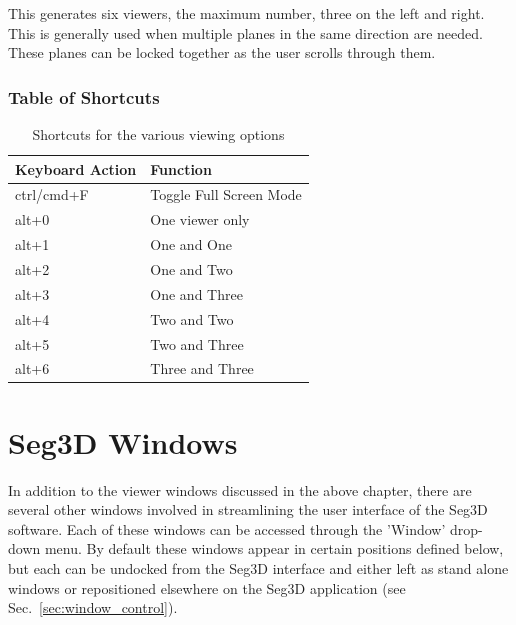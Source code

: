 \documentclass[fleqn,11pt,openany]{book}
\begin{document}
This generates six viewers, the maximum number, three on the left and right.  This is generally used when multiple planes in the same direction are needed.  These planes can be locked together as the user scrolls through them.  

\subsection{Table of Shortcuts}

\begin{table}[h!]
\label{tab:viewerkey}
\caption{Shortcuts for the various viewing options}
\begin{tabular}{|l|l|}
\hline
{\bf Keyboard Action} & {\bf Function}\\
\hline
ctrl/cmd+F & Toggle Full Screen Mode\\
\hline
alt+0 & One viewer only\\
\hline
alt+1 & One and One\\
\hline
alt+2 & One and Two\\
\hline
alt+3 & One and Three\\
\hline
alt+4 & Two and Two\\
\hline
alt+5 & Two and Three\\
\hline
alt+6 & Three and Three\\
\hline
\end{tabular}
\end{table}




\chapter{Seg3D Windows}
\label{sec:windows}

\begin{introduction}
In addition to the viewer windows discussed in the above chapter, there are several other
 windows involved in streamlining the user interface of the Seg3D software.  
 Each of these windows can be accessed through the 'Window' drop-down menu.
 By default these windows appear in certain positions defined below, but each can be undocked
 from the Seg3D interface and either left as stand alone windows or repositioned elsewhere on
 the Seg3D application (see Sec.~\ref{sec:window_control}).  
\end{introduction}
\end{document}
